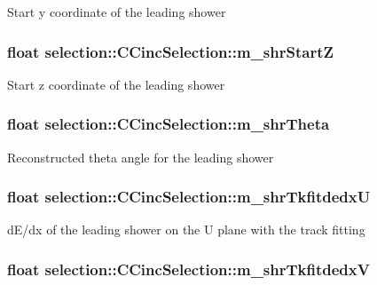 Start y coordinate of the leading shower \hypertarget{classselection_1_1CCincSelection_ac97b3d4c8f1dff8f692de9fc2c9f585c}{
\subsubsection[{m\-\_\-shr\-Start\-Z}]{\setlength{\rightskip}{0pt plus 5cm}float selection\-::\-C\-Cinc\-Selection\-::m\-\_\-shr\-Start\-Z\hspace{0.3cm}{\ttfamily [private]}}}\label{classselection_1_1CCincSelection_ac97b3d4c8f1dff8f692de9fc2c9f585c}
Start z coordinate of the leading shower \hypertarget{classselection_1_1CCincSelection_a1ebf39e7e51249166d11066766c86b3f}{
\subsubsection[{m\-\_\-shr\-Theta}]{\setlength{\rightskip}{0pt plus 5cm}float selection\-::\-C\-Cinc\-Selection\-::m\-\_\-shr\-Theta\hspace{0.3cm}{\ttfamily [private]}}}\label{classselection_1_1CCincSelection_a1ebf39e7e51249166d11066766c86b3f}
Reconstructed theta angle for the leading shower \hypertarget{classselection_1_1CCincSelection_aaa3a14c43d0e840fa3032a46bd498db1}{
\subsubsection[{m\-\_\-shr\-Tkfitdedx\-U}]{\setlength{\rightskip}{0pt plus 5cm}float selection\-::\-C\-Cinc\-Selection\-::m\-\_\-shr\-Tkfitdedx\-U\hspace{0.3cm}{\ttfamily [private]}}}\label{classselection_1_1CCincSelection_aaa3a14c43d0e840fa3032a46bd498db1}
d\-E/dx of the leading shower on the U plane with the track fitting \hypertarget{classselection_1_1CCincSelection_afd1502883efc2504917a3b17eeb4aa46}{
\subsubsection[{m\-\_\-shr\-Tkfitdedx\-V}]{\setlength{\rightskip}{0pt plus 5cm}float selection\-::\-C\-Cinc\-Selection\-::m\-\_\-shr\-Tkfitdedx\-V\hspace{0.3cm}{\ttfamily [private]}}}\label{classselection_1_1CCincSelection_afd1502883efc2504917a3b17eeb4aa46}
